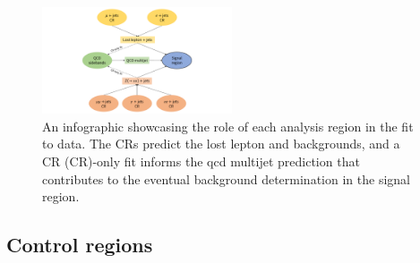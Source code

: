 \begin{figure}[htbp]
    \centering
    \includegraphics[width=0.5\textwidth]{figures/fit_overview.pdf}
    \caption[An infographic showcasing the role of each analysis region in the fit to data]{An infographic showcasing the role of each analysis region in the fit to data. The \glspl{CR} predict the lost lepton and \ztonunu backgrounds, and a \gls{CR} (CR)-only fit informs the \acrshort{qcd} multijet prediction that contributes to the eventual background determination in the signal region.}
    \label{fig:htoinv_fit_overview}
\end{figure}




\subsection{Control regions}
\label{subsec:htoinv_control_regions}

